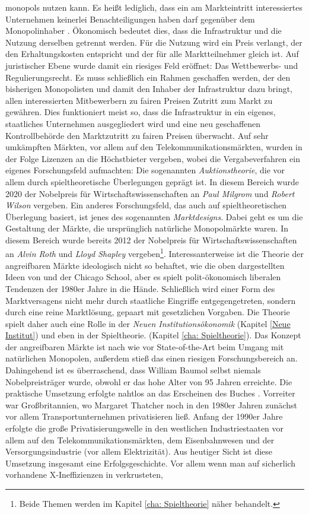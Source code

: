 monopols nutzen kann. Es heißt lediglich, dass ein am Markteintritt interessiertes Unternehmen keinerlei Benachteiligungen haben darf gegenüber dem Monopolinhaber \parencite[S. 3f.]{Baumol1982b}. Ökonomisch bedeutet dies, dass die Infrastruktur und die Nutzung derselben getrennt werden. Für die Nutzung wird ein Preis verlangt, der den Erhaltungskosten entspricht und der für alle Marktteilnehmer gleich ist. Auf juristischer Ebene wurde damit ein riesiges Feld eröffnet: Das Wettbewerbs- und Regulierungsrecht. Es muss schließlich ein Rahmen geschaffen werden, der den bisherigen Monopolisten und damit den Inhaber der Infrastruktur dazu bringt, allen interessierten Mitbewerbern zu fairen Preisen Zutritt zum Markt zu gewähren. Dies funktioniert meist so, dass die Infrastruktur in ein eigenes, staatliches Unternehmen ausgegliedert wird und eine neu geschaffenen Kontrollbehörde den Marktzutritt zu fairen Preisen überwacht. Auf sehr umkämpften Märkten, vor allem auf den Telekommunikationsmärkten, wurden in der Folge Lizenzen an die Höchstbieter vergeben, wobei die Vergabeverfahren ein eigenes Forschungsfeld aufmachten: Die sogenannten \textit{Auktionstheorie}, die vor allem durch spieltheoretische Überlegungen geprägt ist. In diesem Bereich wurde 2020 der Nobelpreis für Wirtschaftswissenschaften an \textit{Paul Milgrom} und \textit{Robert Wilson} vergeben. Ein anderes Forschungsfeld, das auch auf spieltheoretischen Überlegung basiert, ist jenes des sogenannten \textit{Marktdesigns}. Dabei geht es um die Gestaltung der Märkte, die ursprünglich natürliche Monopolmärkte waren. In diesem Bereich wurde bereits 2012 der Nobelpreis für Wirtschaftswissenschaften an \textit{Alvin Roth} und \textit{Lloyd Shapley} vergeben\footnote{Beide Themen werden im Kapitel \ref{cha: Spieltheorie} näher behandelt.}. Interessanterweise ist die Theorie der angreifbaren Märkte ideologisch nicht so behaftet, wie die oben dargestellten Ideen von \textcite{Stigler1971} und der Chicago School, aber es spielt polit-ökonomisch liberalen Tendenzen der 1980er Jahre in die Hände. Schließlich wird einer Form des Marktversagens nicht mehr durch staatliche Eingriffe entgegengetreten, sondern durch eine reine Marktlösung, gepaart mit gesetzlichen Vorgaben. Die Theorie spielt daher auch eine Rolle in der \textit{Neuen Institutionsökonomik} (Kapitel \ref{Neue Institut}) und eben in der Spieltheorie. (Kapitel \ref{cha: Spieltheorie}). Das Konzept der angreifbaren Märkte ist nach wie vor State-of-the-Art beim Umgang mit natürlichen Monopolen, außerdem stieß das einen riesigen Forschungsbereich an. Dahingehend ist es überraschend, dass William Baumol selbst niemals Nobelpreisträger wurde, obwohl er das hohe Alter von 95 Jahren erreichte. Die praktische Umsetzung erfolgte nahtlos an das Erscheinen des Buches \textcite{Baumol1982}. Vorreiter war Großbritannien, wo Margaret Thatcher noch in den 1980er Jahren zunächst vor allem Transportunternehmen privatisieren ließ. Anfang der 1990er Jahre erfolgte die große Privatisierungswelle in den westlichen Industriestaaten vor allem auf den Telekommunikationsmärkten, dem Eisenbahnwesen und der Versorgungsindustrie (vor allem Elektrizität). Aus heutiger Sicht ist diese Umsetzung insgesamt  eine Erfolgsgeschichte. Vor allem wenn man auf sicherlich vorhandene X-Ineffizienzen in verkrusteten, 